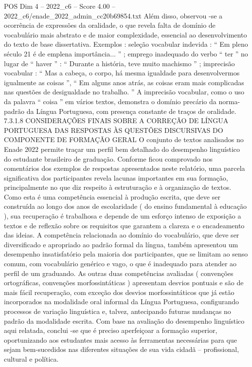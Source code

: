 \begin{textsample}{POS Dim 4 – 2022\_c6 – Score 4.00 – 2022\_c6/enade\_2022\_admin\_cc20b69854.txt}
Além disso, observou -se a ocorrência de expressões da oralidade, o que revela falta de domínio de vocabulário mais abstrato e de maior complexidade, essencial ao desenvolvimento do texto de base dissertativa.
Exemplos : seleção vocabular indevida : “ Em pleno século 21 é de emplena importância... ” ; emprego inadequado do verbo “ ter ” no lugar de “ haver ” : “ Durante a história, teve muito machismo ” ; imprecisão vocabular : “ Mas a cabeça, o corpo, há mesma igualdade para desenvolvermos igualmente as coisas ”, “ Em alguns anos atrás, as coisas eram mais complicadas nas questões de desigualdade no trabalho. ” A imprecisão vocabular, como o uso da palavra “ coisa ” em vários textos, demonstra o domínio precário da norma-padrão da Língua Portuguesa, com presença constante de traços de oralidade. 7.3.1.8 CONSIDERAÇÕES FINAIS SOBRE A CORREÇÃO DE LÍNGUA PORTUGUESA DAS RESPOSTAS ÀS QUESTÕES DISCURSIVAS DO COMPONENTE DE FORMAÇÃO GERAL O conjunto de textos analisados no Enade 2022 permite traçar um perfil bem detalhado do desempenho linguístico do estudante brasileiro de graduação.
Conforme ficou comprovado nos comentários dos exemplos de respostas apresentados neste relatório, uma parcela significativa dos participantes revela lacunas importantes em sua formação, principalmente no que diz respeito à estruturação e à organização de textos.
Como esta é uma competência essencial à produção escrita, que deve ser construída ao longo dos anos de escolaridade ( do ensino fundamental à educação ), sua recuperação é trabalhosa e depende de um esforço intenso de exposição a textos e de reflexão sobre os requisitos que garantem a clareza e o encadeamento das ideias.
A competência relacionada ao domínio do vocabulário, que deve ser diversificado e apropriado ao padrão formal da língua, também apresentou um desempenho insatisfatório pela maioria dos participantes, que se limitam ao senso comum, com vocabulário genérico e vago, o que é inadequado para atender ao perfil de um graduando.
As outras duas competências avaliadas ( convenções ortográficas, convenções morfossintáticas ) apresentam desvios pontuais e são de mais fácil recuperação, com exceção dos desvios morfossintáticos que já estão incorporados na modalidade oral informal da Língua Portuguesa, configurando processos de variação linguística e, talvez, antecipando futuras mudanças no padrão da modalidade escrita.
Com base na avaliação do desempenho linguístico aqui relatada, conclui -se que é preciso aperfeiçoar a formação superior, oportunizando aos estudantes mais acesso às ferramentas necessárias para que sejam bem-sucedidos nas diferentes situações de sua vida cidadã – profissional, cultural e política.

\end{textsample}

